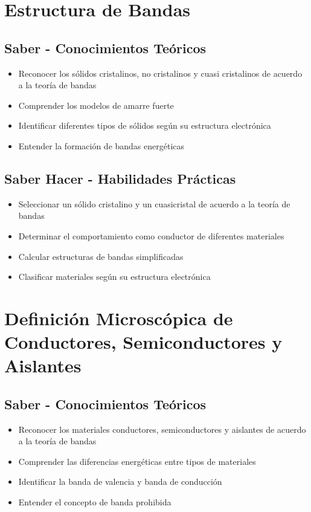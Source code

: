 \documentclass[12pt,a4paper,twoside]{book}
\begin{document}
	\section{Estructura de Bandas}
	\label{sec:estructura_bandas}
	
	\subsection{Saber - Conocimientos Teóricos}
	\begin{saberbox}
		\begin{itemize}
			\item Reconocer los sólidos cristalinos, no cristalinos y cuasi cristalinos de acuerdo a la teoría de bandas
			\item Comprender los modelos de amarre fuerte
			\item Identificar diferentes tipos de sólidos según su estructura electrónica
			\item Entender la formación de bandas energéticas
		\end{itemize}
	\end{saberbox}
	
	\subsection{Saber Hacer - Habilidades Prácticas}
	\begin{hacerbox}
		\begin{itemize}
			\item Seleccionar un sólido cristalino y un cuasicristal de acuerdo a la teoría de bandas
			\item Determinar el comportamiento como conductor de diferentes materiales
			\item Calcular estructuras de bandas simplificadas
			\item Clasificar materiales según su estructura electrónica
		\end{itemize}
	\end{hacerbox}
	
	\section{Definición Microscópica de Conductores, Semiconductores y Aislantes}
	\label{sec:conductores_semiconductores}
	
	\subsection{Saber - Conocimientos Teóricos}
	\begin{saberbox}
		\begin{itemize}
			\item Reconocer los materiales conductores, semiconductores y aislantes de acuerdo a la teoría de bandas
			\item Comprender las diferencias energéticas entre tipos de materiales
			\item Identificar la banda de valencia y banda de conducción
			\item Entender el concepto de banda prohibida
		\end{itemize}
	\end{saberbox}
	
\end{document}
